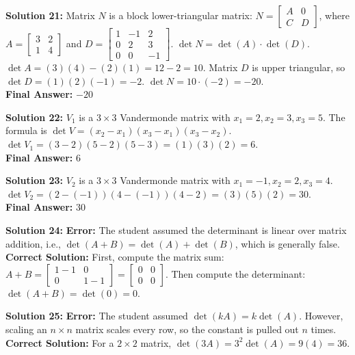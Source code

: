 \documentclass[11pt]{article}
\begin{document}
\vspace{0.5cm}
\textbf{Solution 21:}
Matrix $N$ is a block lower-triangular matrix: $N = \begin{bmatrix} A & 0 \\ C & D \end{bmatrix}$, where $A = \begin{bmatrix} 3 & 2 \\ 1 & 4 \end{bmatrix}$ and $D = \begin{bmatrix} 1 & -1 & 2 \\ 0 & 2 & 3 \\ 0 & 0 & -1 \end{bmatrix}$.
$\det N = \det(A) \cdot \det(D)$.
$\det A = (3)(4) - (2)(1) = 12 - 2 = 10$.
Matrix $D$ is upper triangular, so $\det D = (1)(2)(-1) = -2$.
$\det N = 10 \cdot (-2) = -20$. \\
\textbf{Final Answer:} $-20$

\vspace{0.5cm}
\textbf{Solution 22:}
$V_1$ is a $3 \times 3$ Vandermonde matrix with $x_1 = 2, x_2 = 3, x_3 = 5$.
The formula is $\det V = (x_2 - x_1)(x_3 - x_1)(x_3 - x_2)$.
$\det V_1 = (3 - 2)(5 - 2)(5 - 3) = (1)(3)(2) = 6$. \\
\textbf{Final Answer:} $6$

\vspace{0.5cm}
\textbf{Solution 23:}
$V_2$ is a $3 \times 3$ Vandermonde matrix with $x_1 = -1, x_2 = 2, x_3 = 4$.
$\det V_2 = (2 - (-1))(4 - (-1))(4 - 2) = (3)(5)(2) = 30$. \\
\textbf{Final Answer:} $30$

\vspace{0.5cm}
\textbf{Solution 24:}
\textbf{Error:} The student assumed the determinant is linear over matrix addition, i.e., $\det(A+B) = \det(A) + \det(B)$, which is generally false.
\textbf{Correct Solution:} First, compute the matrix sum: $A + B = \begin{bmatrix} 1-1 & 0 \\ 0 & 1-1 \end{bmatrix} = \begin{bmatrix} 0 & 0 \\ 0 & 0 \end{bmatrix}$.
Then compute the determinant: $\det(A+B) = \det(0) = 0$.

\vspace{0.5cm}
\textbf{Solution 25:}
\textbf{Error:} The student assumed $\det(kA) = k \det(A)$. However, scaling an $n \times n$ matrix scales every row, so the constant is pulled out $n$ times.
\textbf{Correct Solution:} For a $2 \times 2$ matrix, $\det(3A) = 3^2 \det(A) = 9(4) = 36$.
\end{document}
